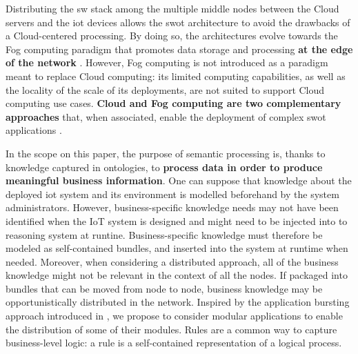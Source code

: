 \documentclass{iosart2c}
\begin{document}
Distributing the \gls{sw} stack among the multiple middle nodes between the Cloud servers and the \gls{iot} devices allows the \gls{swot} architecture to avoid the drawbacks of a Cloud-centered processing.
By doing so, the architectures evolve towards the Fog computing paradigm \cite{Bonomi2012} that promotes data storage and processing \textbf{at the edge of the network} \cite{Patel2017}.
However, Fog computing is not introduced as a paradigm meant to replace Cloud computing: its limited computing capabilities, as well as the locality of the scale of its deployments, are not suited to support Cloud computing use cases.
\textbf{Cloud and Fog computing are two complementary approaches} that, when associated, enable the deployment of complex \gls{swot} applications \cite{Sahni2017}.

In the scope on this paper, the  purpose of semantic processing is, thanks to knowledge captured in ontologies, to \textbf{process data in order to produce meaningful business information}. 
One can suppose that knowledge about the deployed \gls{iot} system and its environment is modelled beforehand by the system administrators.
However, business-specific knowledge needs may not have been identified when the IoT system is designed and might need to be injected into to reasoning system at runtine.
Business-specific knowledge must therefore be modeled as self-contained bundles, and inserted into the system at runtime when needed.
Moreover, when considering a distributed approach, all of the business knowledge might not be relevant in the context of all the nodes. 
If packaged into bundles that can be moved from node to node, business knowledge may be opportunistically distributed in the network. 
Inspired by the application bursting approach introduced in \cite{Charrada2016}, we propose to consider modular applications to enable the distribution of some of their modules.
Rules are a common way to capture business-level logic: a rule is a self-contained representation of a logical process.
\end{document}
